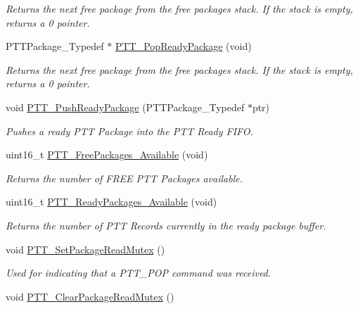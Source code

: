 \begin{DoxyCompactItemize}
\begin{DoxyCompactList}\small\item\em Returns the next free package from the free packages stack. If the stack is empty, returns a 0 pointer. \end{DoxyCompactList}\item 
P\+T\+T\+Package\+\_\+\+Typedef $\ast$ \hyperlink{group___p_t_t___service_gadc0586652f7800ac7d8f5fc1602e9413}{P\+T\+T\+\_\+\+Pop\+Ready\+Package} (void)
\begin{DoxyCompactList}\small\item\em Returns the next free package from the free packages stack. If the stack is empty, returns a 0 pointer. \end{DoxyCompactList}\item 
void \hyperlink{group___p_t_t___service_gabee25d161901d349ca414c842d1d40c1}{P\+T\+T\+\_\+\+Push\+Ready\+Package} (P\+T\+T\+Package\+\_\+\+Typedef $\ast$ptr)
\begin{DoxyCompactList}\small\item\em Pushes a ready P\+TT Package into the P\+TT Ready F\+I\+FO. \end{DoxyCompactList}\item 
uint16\+\_\+t \hyperlink{group___p_t_t___service_gac724bfd5cc2a6ee83d69e55ada24d523}{P\+T\+T\+\_\+\+Free\+Packages\+\_\+\+Available} (void)
\begin{DoxyCompactList}\small\item\em Returns the number of F\+R\+EE P\+TT Packages available. \end{DoxyCompactList}\item 
uint16\+\_\+t \hyperlink{group___p_t_t___service_ga4a212273c3b5f412315e299ba2d29b71}{P\+T\+T\+\_\+\+Ready\+Packages\+\_\+\+Available} (void)
\begin{DoxyCompactList}\small\item\em Returns the number of P\+TT Records currently in the ready package buffer. \end{DoxyCompactList}\item 
void \hyperlink{group___p_t_t___service_ga82a1eaef3ef13fdfe4f6f5202344911b}{P\+T\+T\+\_\+\+Set\+Package\+Read\+Mutex} ()
\begin{DoxyCompactList}\small\item\em Used for indicating that a P\+T\+T\+\_\+\+P\+OP command was received. \end{DoxyCompactList}\item 
void \hyperlink{group___p_t_t___service_ga2e10a37813087c50a43c904015fbdba1}{P\+T\+T\+\_\+\+Clear\+Package\+Read\+Mutex} ()

\end{DoxyCompactItemize}
